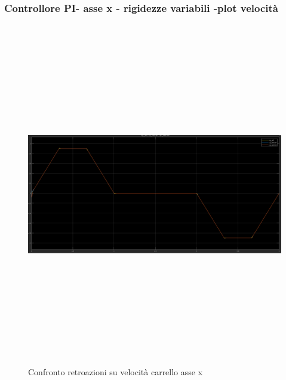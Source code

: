 \documentclass{article}
\begin{document}
\subsubsection{Controllore PI- asse x  - rigidezze variabili -plot velocità}

\begin{figure}[H]
\centering
\includegraphics[width=13cm,height=15cm,keepaspectratio]{./simulink/ldm_variabile/PIDX_VELOCITA}
\caption{Confronto retroazioni su velocità carrello asse x}

\end{figure}
\end{document}
